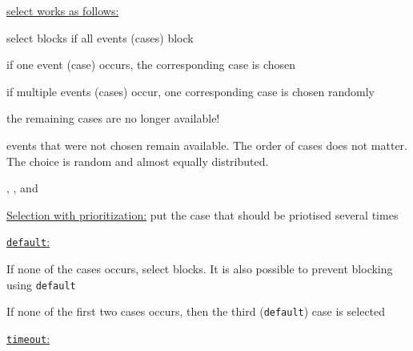 \documentclass[landscape, a4paper]{article}
\begin{document}
\begin{minipage}[t]{0.2\linewidth}
\begin{betterlist}
		\adjustbox{scale=0.5}{
      \begin{dnumberedcodebox}[minted language=go,minted options={autogobble, fontsize=\tiny,numbersep=0.3cm,linenos}, box align=top]
      select {
        case x = <-ch1:
            ...
        case y = <-ch2:
            ...
        case ch3 <- 1:
            ...
      }
      \end{dnumberedcodebox}
		}
		\item \underline{select works as follows:}
		\begin{betterlist}
			\item select blocks if all events (cases) block
			\item if one event (case) occurs, the corresponding case is chosen
			\item if multiple events (cases) occur, one corresponding case is chosen randomly
			\item the remaining cases are no longer available!
		\end{betterlist}
		\item events that were not chosen remain available. The order of cases does not matter. The choice is random and almost equally distributed.
		\item {}, ,  and 
		\item \underline{Selection with prioritization:} put the case that should be priotised several times
		\item \underline{\texttt{default}:}

		\adjustbox{scale=0.5}{
      \begin{dnumberedcodebox}[minted language=go,minted options={autogobble, fontsize=\tiny,numbersep=0.3cm,linenos}, box align=top]
        select {
          case <-ch1:
          case ch2<-1:
          default:
        }
      \end{dnumberedcodebox}
		}
		\begin{betterlist}
			\item If none of the cases occurs, select blocks. It is also possible to prevent blocking using \texttt{default}
			\item If none of the first two cases occurs, then the third (\texttt{default}) case is selected
		\end{betterlist}
		\item \underline{\texttt{timeout}:}


\end{betterlist}
\end{minipage}
\end{document}
